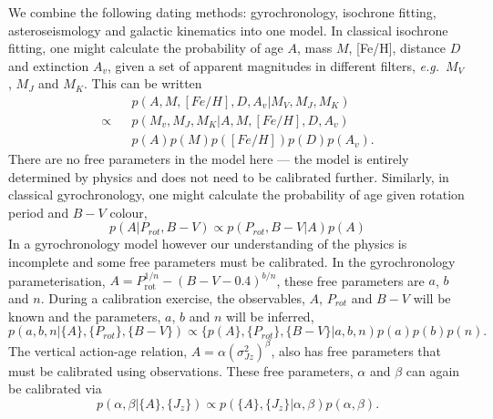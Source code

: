 \documentclass[useAMS, usenatbib, preprint, 12pt]{aastex}
\newcommand{\feh}{[Fe/H]}
\newcommand{\av}{$A_v$}
\newcommand{\eg}{{\it e.g.}}
\begin{document}
We combine the following dating methods: gyrochronology, isochrone fitting,
asteroseismology and galactic kinematics into one model.
In classical isochrone fitting, one might calculate the probability of age
$A$, mass $M$, \feh, distance $D$ and extinction \av, given a set of
apparent magnitudes in different filters, \eg\ $M_V$, $M_J$ and $M_K$.
This can be written
\begin{eqnarray}
    &&p(A, M, [Fe/H], D, A_v | M_V, M_J, M_K) \\ \nonumber
    \propto &&p(M_v, M_J, M_K | A, M, [Fe/H], D, A_v) \\ \nonumber
    &&p(A)p(M)p([Fe/H])p(D)p(A_v).
\end{eqnarray}
There are no free parameters in the model here --- the model is entirely
determined by physics and does not need to be calibrated further.
Similarly, in classical gyrochronology, one might calculate the probability of
age given rotation period and $B-V$ colour,
\begin{equation}
    p(A | P_{rot}, B-V) \propto p(P_{rot}, B-V | A)p(A)
\end{equation}
In a gyrochronology model however our understanding of the physics is
incomplete and some free parameters must be calibrated.
In the \citet{Barnes2003} gyrochronology parameterisation, $A =
P_{\mathrm{rot}}^{1/n} - (B-V-0.4)^{b/n}$, these free parameters are $a$, $b$
and $n$.
During a calibration exercise, the observables, $A$, $P_{rot}$ and $B-V$ will
be known and the parameters, $a$, $b$ and $n$ will be inferred,
\begin{equation}
    p(a, b, n | \{A\}, \{P_{rot}\}, \{B-V\}) \propto \{p(A\}, \{P_{rot}\},
    \{B-V\} | a, b, n) p(a)p(b)p(n).
\end{equation}
The vertical action-age relation, $A = \alpha (\sigma_{Jz}^2)^\beta$,
also has free parameters that must be calibrated using observations.
These free parameters, $\alpha$ and $\beta$ can again be calibrated via
\begin{equation}
    p(\alpha, \beta | \{A\}, \{J_z\}) \propto p(\{A\}, \{J_z\} | \alpha,
    \beta) p(\alpha, \beta).
\end{equation}
\end{document}
